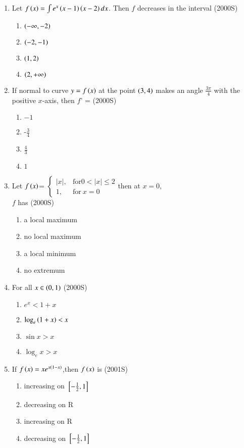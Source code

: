 \documentclass[journal,12pt,twocolumn]{IEEEtran}
\theoremstyle{remark}
\begin{document}
\begin{enumerate}[start=9]
\item Let $f\left(x\right)=\int e^x\left(x-1\right)\left(x-2\right)dx$. Then $f$ decreases in the interval 
\hfill (2000S)
\begin{enumerate}
	\item $\left(-\infty,-2\right)$
	\item $\left(-2,-1\right)$
	\item $\left(1,2\right)$
	\item $\left(2,+\infty\right)$\\
\end{enumerate}
\item If normal to curve $y=f\left(x\right)$ at the point $\left(3,4\right)$ makes an angle $\frac{3\pi}{4}$ with the positive $x$-axis, then $f$' = \hfill(2000S)
\begin{enumerate}
    \item $-1$
    \item -$\frac{3}{4}$\\
    \item $\frac{4}{3}$
    \item $1$
\end{enumerate}
\item Let $f\left(x\right)$=
$\begin{cases}
|x|, & \text{for}  0<|x| \leq 2\\ 
1, & \text{for}\  x=0
\end{cases}$then at $x=0$, \\$f$ has
\hfill (2000S)
\begin{enumerate}
    \item a local maximum
    \item no local maximum
    \item a local minimum
    \item no extremum\\
\end{enumerate}
\item For all $x\in\left(0,1\right)$
\hfill (2000S)
\begin{enumerate}
    \item $e^x <1+x$
    \item $\log_e \left(1+x\right) < x$
    \item$\sin{x} > x$
    \item$\log_e{x} > x $\\
\end{enumerate}
\item If $f\left(x\right)=xe^{x\left(1-x\right)}$,then $f\left(x\right)$ is 
\hfill (2001S)
\begin{enumerate}
    \item increasing on ${}\left[-\frac{1}{2},1\right]$\\
    \item decreasing on R
    \item increasing on R
    \item decreasing on ${}\left[-\frac{1}{2},1\right]$\\
\end{enumerate}


\end{enumerate}
\end{document}
